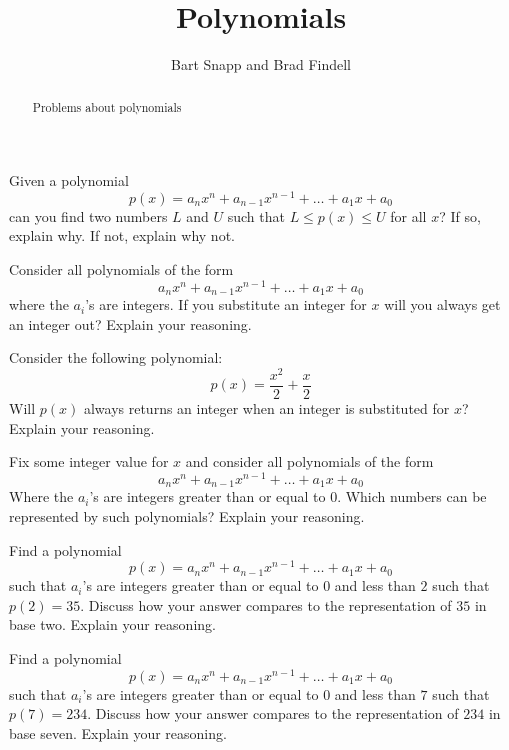 \documentclass[nooutcomes]{ximera}
\title{Polynomials}
\author{Bart Snapp and Brad Findell}
\begin{document}
\begin{abstract}
Problems about polynomials 
\end{abstract}
\maketitle


\begin{problem}Given a polynomial
\[
p(x) = a_nx^n + a_{n-1}x^{n-1} + \dots + a_1 x+ a_0
\]
can you find two numbers $L$ and $U$ such that $L \le p(x) \le U$ for
all $x$? If so, explain why. If not, explain why not.
\end{problem} \begin{problem}Consider all polynomials of the form
\[
a_nx^n + a_{n-1}x^{n-1} + \dots + a_1 x+ a_0
\]
where the $a_i$'s are integers. If you substitute an integer for $x$
will you always get an integer out? Explain your reasoning.
\end{problem} \begin{problem}Consider the following polynomial:
\[
p(x) = \frac{x^2}{2}+\frac{x}{2}
\]
Will $p(x)$ always returns an integer when an integer is substituted
for $x$? Explain your reasoning.

\end{problem} 

\begin{problem}Fix some integer value for $x$ and consider all polynomials of
  the form
\[
a_nx^n + a_{n-1}x^{n-1} + \dots + a_1 x+ a_0
\]
Where the $a_i$'s are integers greater than or equal to $0$. Which
numbers can be represented by such polynomials? Explain your
reasoning.
\end{problem} 

\begin{problem}Find a polynomial 
\[
p(x) = a_nx^n + a_{n-1}x^{n-1} + \dots + a_1 x+ a_0
\]
such that $a_i$'s are integers greater than or equal to $0$ and less
than $2$ such that $p(2) = 35$. Discuss how your answer compares to
the representation of $35$ in base two. Explain your reasoning.
\end{problem} 

\begin{problem}Find a polynomial 
\[
p(x) = a_nx^n + a_{n-1}x^{n-1} + \dots + a_1 x+ a_0
\]
such that $a_i$'s are integers greater than or equal to $0$ and less
than $7$ such that $p(7) = 234$. Discuss how your answer compares to
the representation of $234$ in base seven. Explain your reasoning. 
\end{problem} 
\end{document}
